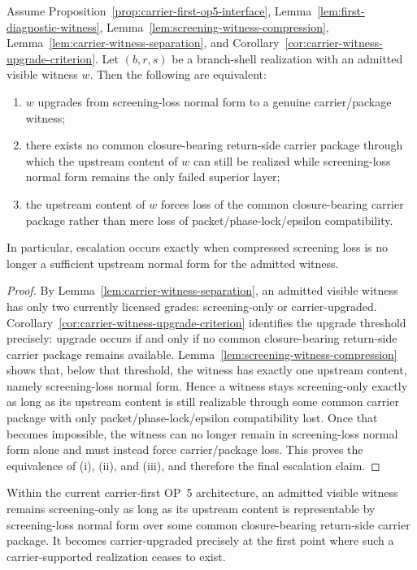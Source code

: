 \begin{lemma}
\label{lem:witness-to-carrier-escalation}
Assume Proposition~\ref{prop:carrier-first-op5-interface}, Lemma~\ref{lem:first-diagnostic-witness}, Lemma~\ref{lem:screening-witness-compression}, Lemma~\ref{lem:carrier-witness-separation}, and Corollary~\ref{cor:carrier-witness-upgrade-criterion}. Let $(b,r,s)$ be a branch-shell realization with an admitted visible witness $w$. Then the following are equivalent:
\begin{enumerate}[leftmargin=2em,label=(\roman*)]
\item $w$ upgrades from screening-loss normal form to a genuine carrier/package witness;
\item there exists no common closure-bearing return-side carrier package through which the upstream content of $w$ can still be realized while screening-loss normal form remains the only failed superior layer;
\item the upstream content of $w$ forces loss of the common closure-bearing carrier package rather than mere loss of packet/phase-lock/epsilon compatibility.
\end{enumerate}
In particular, escalation occurs exactly when compressed screening loss is no longer a sufficient upstream normal form for the admitted witness.
\end{lemma}

\begin{proof}
By Lemma~\ref{lem:carrier-witness-separation}, an admitted visible witness has only two currently licensed grades: screening-only or carrier-upgraded. Corollary~\ref{cor:carrier-witness-upgrade-criterion} identifies the upgrade threshold precisely: upgrade occurs if and only if no common closure-bearing return-side carrier package remains available. Lemma~\ref{lem:screening-witness-compression} shows that, below that threshold, the witness has exactly one upstream content, namely screening-loss normal form. Hence a witness stays screening-only exactly as long as its upstream content is still realizable through some common carrier package with only packet/phase-lock/epsilon compatibility lost. Once that becomes impossible, the witness can no longer remain in screening-loss normal form alone and must instead force carrier/package loss. This proves the equivalence of (i), (ii), and (iii), and therefore the final escalation claim.
\end{proof}

\begin{corollary}
\label{cor:carrier-escalation-threshold}
Within the current carrier-first OP~5 architecture, an admitted visible witness remains screening-only as long as its upstream content is representable by screening-loss normal form over some common closure-bearing return-side carrier package. It becomes carrier-upgraded precisely at the first point where such a carrier-supported realization ceases to exist.
\end{corollary}

